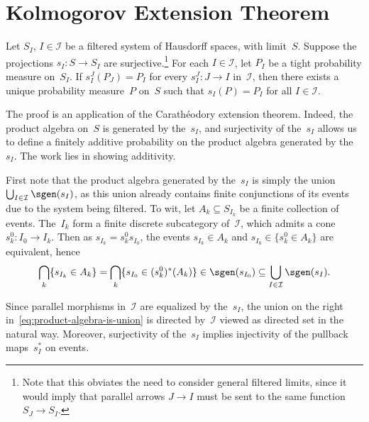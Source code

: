 \chapter	{Kolmogorov Extension Theorem}

\begin	{theorem}	
Let $S_I$, \( I \in \mathcal I \) be a filtered system of Hausdorff spaces,
with limit~$S$.
Suppose the projections \( s_I \colon S \to S_I \) are surjective.\footnote
	{Note that this obviates the need to consider general
	filtered limits,
	since it would imply that parallel arrows \( J \to I \)
	must be sent to the same function \( S_J \to S_I \).}
For each \( I \in \mathcal I \), let $P_I$ be a tight probability measure
on~$S_I$.
If \( s_I^J(P_J) = P_I \) for every \( s_I^J \colon J \to I \) in~$\mathcal I$,
then there exists a unique probability measure~$P$ on~$S$ such that
\( s_I(P) = P_I \) for all \( I \in \mathcal I \).
\end	{theorem}
The proof is an application of the Carathéodory extension theorem.
Indeed, the product \sig algebra on~$S$ is generated by the~$s_I$,
and surjectivity of the~$s_I$ allows us to define a finitely additive
probability on the product algebra generated by the~$s_I$.
The work lies in showing \sig additivity.

First note that the product algebra generated by the~$s_I$
is simply the union
\( \bigcup_{I \in \mathcal I} \sgen(s_I) \),
as this union already contains finite conjunctions of its events
due to the system being filtered.
To wit, let \( A_k \subseteq S_{I_k} \) be a finite collection of events.
The~$I_k$ form a finite discrete subcategory of~$\mathcal I$,
which admits a cone \( s_k^0 \colon I_0 \to I_k \).
Then as \( s_{I_k} = s_k^0 s_{I_0} \),
the events \( s_{I_k} \in A_k \) and \( s_{I_0} \in \{s_k^0 \in A_k\} \)
are equivalent, hence
\begin	{equation}
\label	{eq:product-algebra-is-union}
	\bigcap_k \{s_{I_k} \in A_k\}
		= \bigcap_k \{s_{I_0} \in (s_k^0)^*(A_k)\}
		\in \sgen(s_{I_0})
		\subseteq \bigcup_{I \in \mathcal I} \sgen(s_I)
	\text.
\end	{equation}

Since parallel morphisms in~$\mathcal I$ are equalized by the~$s_I$,
the union on the right in~\eqref{eq:product-algebra-is-union}
is directed by~$\mathcal I$ viewed as directed set in the natural way.
Moreover, surjectivity of the~$s_I$ implies injectivity
of the pullback maps~$s_I^*$ on events.

